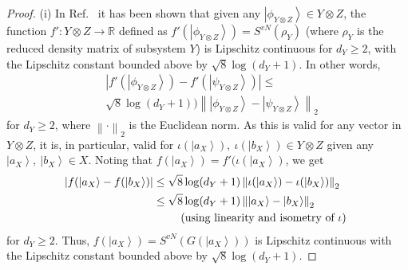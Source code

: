 \documentclass[pre,aps,showpacs,showkeys,twocolumn]{revtex4-1}
\newcommand\norm[1]{\left\lVert#1\right\rVert}
\newcommand\ket[1]{\left|#1\right\rangle}
\theoremstyle{definition}
\theoremstyle{remark}
\begin{document}
\begin{proof}
    (i) In Ref.~\cite{hayden2006aspects} it has been shown that given any $\ket{\phi_{Y \otimes Z}} \in Y \otimes Z$, the function $f' \colon Y \otimes Z \to \mathbb{R}$ defined as $f'(\ket{\phi_{Y \otimes Z}}) = S^{vN}(\rho_Y)$ (where $\rho_Y$ is the reduced density matrix of subsystem $Y$) is Lipschitz continuous for $d_Y \geq 2$, with the Lipschitz constant bounded above by $\sqrt{8} \log(d_Y + 1)$. In other words,
    \begin{align*}
       & |f'(\ket{\phi_{Y \otimes Z}}) - f'(\ket{\psi_{Y \otimes Z}})|
                            \leq \\ & \sqrt{8} \log(d_Y + 1)) \norm{\ket{\phi_{Y \otimes Z}} - \ket{\psi_{Y \otimes Z}}}_2
    \end{align*}
    for $d_Y \geq 2$, where $\norm{\cdot}_2$ is the Euclidean norm. As this is valid for any vector in $Y \otimes Z$, it is, in particular, valid for $\iota(\ket{a_X}),\ \iota(\ket{b_X}) \in Y \otimes Z$ given any $\ket{a_X},\ \ket{b_X} \in X$. Noting that $f(\ket{a_X}) = f'(\iota(\ket{a_X})$, we get
    \begin{align*}
        |f(\ket{a_X} - f(\ket{b_X})| &\leq \sqrt{8} \log(d_Y + 1) \norm{\iota(\ket{a_X}) - \iota(\ket{b_X})}_2 \\
                                     &\leq \sqrt{8} \log(d_Y + 1) \norm{\ket{a_X} - \ket{b_X}}_2 \\
                                     &\hspace{0.75cm} \text{ (using linearity and isometry of $\iota$) }
    \end{align*}
    for $d_Y \geq 2$. Thus, $f(\ket{a_X}) = S^{vN}(G(\ket{a_X}))$ is Lipschitz continuous with the Lipschitz constant bounded above by $\sqrt{8} \log(d_Y + 1)$.
    \newline


\end{proof}
\end{document}
